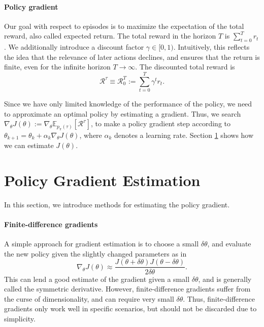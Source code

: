 \documentclass[conference, final]{IEEEtran}
\begin{document}
\paragraph{Policy gradient} 
Our goal with respect to episodes is to maximize the expectation of the total reward, also called expected return. 
The total reward in the horizon $T$ is $\sum_{t=0}^{T} r_{t}$. 
We additionally introduce a discount factor $\gamma \in [0,1)$.
Intuitively, this reflects the idea that the relevance of later actions declines, and ensures that the return is finite, even for the infinite horizon $T \to \infty$. 
The discounted total reward is 
\begin{equation}
  \mathcal{R}^\tau \equiv \mathcal{R}_0^T := \sum_{t=0}^{T} \gamma^t r_t.
  \label{eqn:acc-reward}
\end{equation}

Since we have only limited knowledge of the performance of the policy, we need to approximate an optimal policy by estimating a gradient. 
Thus, we search $\nabla_\theta J(\theta) := \nabla_\theta \mathbb{E}_{p_\pi(\tau)}\left[\mathcal{R}^\tau\right]$, to make a policy gradient step according to $\theta_{k+1} = \theta_k + \alpha_k \nabla_\theta J(\theta)$, where $\alpha_k$ denotes a learning rate. 
Section \ref{sec:pge} shows how we can estimate $J(\theta)$.

\section{Policy Gradient Estimation}
\label{sec:pge}

In this section, we introduce methods for estimating the policy gradient.

\paragraph{Finite-difference gradients} 
A simple approach for gradient estimation is to choose a small $\delta\theta$, and evaluate the new policy given the slightly changed parameters as in 
\begin{equation}
	\nabla_\theta J(\theta) \approx \frac{J(\theta+\delta\theta)J(\theta-\delta\theta)}{2\delta\theta}.
\end{equation} 
This can lend a good estimate of the gradient given a small $\delta \theta$, and is generally called the symmetric derivative. 
However, finite-difference gradients suffer from the curse of dimensionality, and can require very small $\delta\theta$.
Thus, finite-difference gradients only work well in specific scenarios, but should not be discarded due to simplicity.
\end{document}
